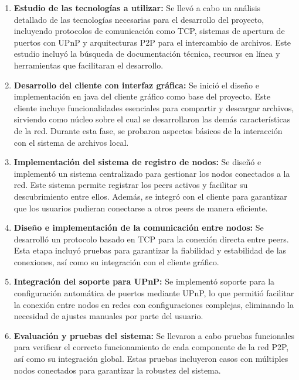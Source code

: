 \begin{enumerate}

    \item \textbf{Estudio de las tecnologías a utilizar:}
    Se llevó a cabo un análisis detallado de las tecnologías necesarias para el desarrollo del proyecto, incluyendo protocolos de comunicación como TCP,
    sistemas de apertura de puertos con UPnP y arquitecturas P2P para el intercambio de archivos.
    Este estudio incluyó la búsqueda de documentación técnica, recursos en línea y herramientas que facilitaran el desarrollo.

    \item \textbf{Desarrollo del cliente con interfaz gráfica:}
    Se inició el diseño e implementación en java del cliente gráfico como base del proyecto.
    Este cliente incluye funcionalidades esenciales para compartir y descargar archivos, sirviendo como núcleo sobre el cual se desarrollaron las demás características de la red.
    Durante esta fase, se probaron aspectos básicos de la interacción con el sistema de archivos local.

    \item \textbf{Implementación del sistema de registro de nodos:}
    Se diseñó e implementó un sistema centralizado para gestionar los nodos conectados a la red.
    Este sistema permite registrar los peers activos y facilitar su descubrimiento entre ellos.
    Además, se integró con el cliente para garantizar que los usuarios pudieran conectarse a otros peers de manera eficiente.

    \item \textbf{Diseño e implementación de la comunicación entre nodos:}
    Se desarrolló un protocolo basado en TCP para la conexión directa entre peers.
    Esta etapa incluyó pruebas para garantizar la fiabilidad y estabilidad de las conexiones, así como su integración con el cliente gráfico.

    \item \textbf{Integración del soporte para UPnP:}
    Se implementó soporte para la configuración automática de puertos mediante UPnP, lo que permitió facilitar la conexión entre nodos en redes con configuraciones complejas,
    eliminando la necesidad de ajustes manuales por parte del usuario.

    \item \textbf{Evaluación y pruebas del sistema:}
    Se llevaron a cabo pruebas funcionales para verificar el correcto funcionamiento de cada componente de la red P2P, así como su integración global.
    Estas pruebas incluyeron casos con múltiples nodos conectados para garantizar la robustez del sistema.


\end{enumerate}
